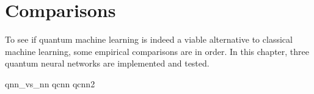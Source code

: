 \chapter{Comparisons}
\label{chap:comparison}

To see if quantum machine learning is indeed a viable alternative to classical machine learning, some empirical comparisons are in order.
In this chapter, three quantum neural networks are implemented and tested.

{qnn_vs_nn}
{qcnn}
{qcnn2}